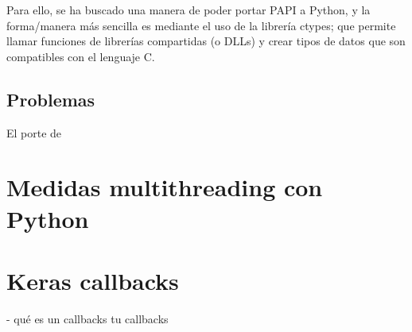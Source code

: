 Para ello, se ha buscado una manera de poder portar PAPI a Python, y la forma/manera más sencilla es mediante el uso de la librería ctypes; que permite llamar funciones de librerías compartidas (o DLLs) y crear tipos de datos que son compatibles con el lenguaje C.

\subsection{Problemas}
El porte de 


\section{Medidas multithreading con Python}



\section{Keras callbacks}

- qué es un callbacks
tu callbacks

